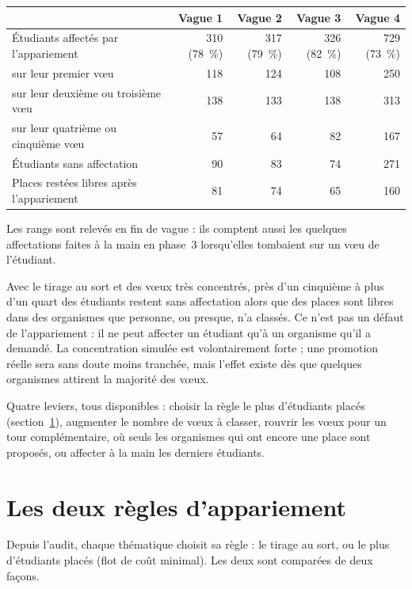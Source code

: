 \documentclass[11pt,a4paper]{article}
\begin{document}
\begin{center}
\begin{tabularx}{\linewidth}{@{}X r r r r@{}}
\toprule
& \textbf{Vague 1} & \textbf{Vague 2} & \textbf{Vague 3} & \textbf{Vague 4} \\
\midrule
Étudiants affectés par l'appariement & 310 (78~\%) & 317 (79~\%) & 326 (82~\%) & 729 (73~\%) \\
\quad sur leur premier vœu & 118 & 124 & 108 & 250 \\
\quad sur leur deuxième ou troisième vœu & 138 & 133 & 138 & 313 \\
\quad sur leur quatrième ou cinquième vœu & 57 & 64 & 82 & 167 \\
Étudiants sans affectation & 90 & 83 & 74 & 271 \\
Places restées libres après l'appariement & 81 & 74 & 65 & 160 \\
\bottomrule
\end{tabularx}
\end{center}

Les rangs sont relevés en fin de vague : ils comptent aussi les quelques affectations faites à la
main en phase~3 lorsqu'elles tombaient sur un vœu de l'étudiant.

Avec le tirage au sort et des vœux très concentrés, près d'un cinquième à plus d'un quart des
étudiants restent sans affectation alors que des places sont libres dans des organismes que personne, ou presque, n'a classés. Ce n'est pas un
défaut de l'appariement : il ne peut affecter un étudiant qu'à un organisme qu'il a demandé. La
concentration simulée est volontairement forte ; une promotion réelle sera sans doute moins
tranchée, mais l'effet existe dès que quelques organismes attirent la majorité des vœux.

Quatre leviers, tous disponibles : choisir la règle \og le plus d'étudiants placés\fg{}
(section~\ref{sec:regles}), augmenter le nombre de vœux à classer, rouvrir les vœux pour un tour
complémentaire, où seuls les organismes qui ont encore une place sont proposés, ou affecter à la main
les derniers étudiants.

\section{Les deux règles d'appariement}\label{sec:regles}

Depuis l'audit, chaque thématique choisit sa règle : le tirage au sort, ou \og le plus d'étudiants
placés\fg{} (flot de coût minimal). Les deux sont comparées de deux façons.
\end{document}

